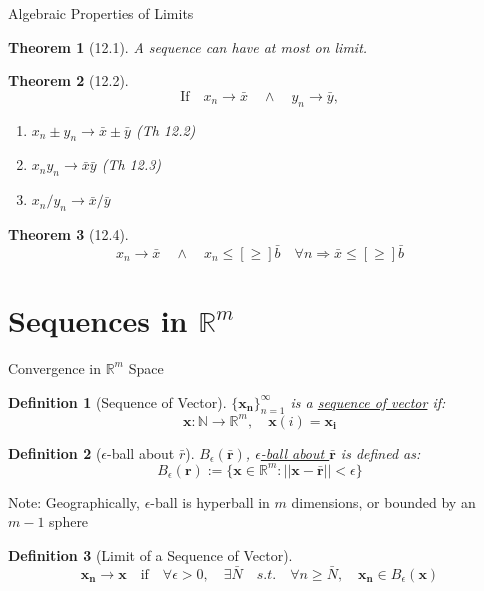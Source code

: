 \documentclass[a4paper,11pt]{article}
\newtheorem{defn}{Definition}
\newtheorem{thm}{Theorem}
\begin{document}
\begin{frame}[t]{Algebraic Properties of Limits}
	\begin{thm}
		[12.1] A sequence can have at most on limit.
	\end{thm}
	\begin{thm}
		[12.2]
		\[
			\text{If}\quad x_n \rightarrow \bar x \quad\land\quad y_n \rightarrow \bar y, 
		\]
		\begin{enumerate}
			\item $x_n\pm y_n \rightarrow \bar x \pm \bar y$ (Th 12.2)
			\item $x_n y_n \rightarrow \bar x \bar y$ (Th 12.3)
			\item $x_n / y_n \rightarrow \bar x / \bar y $
		\end{enumerate}
	\end{thm}
	\begin{thm}
		[12.4] \[
			x_n \rightarrow \bar x \quad\land\quad x_n \le[\ge] \bar b\quad\forall n \Rightarrow \bar x \le[\ge] \bar b 
		\]
	\end{thm}
\end{frame}

\section{Sequences in $\mathbb{R}^m$} %
\label{sec:sequences_in_mathbb_r_m}
\begin{frame}[t]{Convergence in $\mathbb{R}^m$ Space}
	\begin{defn}
		[Sequence of Vector]
		$\{\mathbf{x_n}\}_{n=1}^\infty$ is a \uline{sequence of vector} if:
		\[
			\mathbf{x}:\mathbb{N}\rightarrow \mathbb{R}^m,\quad \mathbf{x}(i) = \mathbf{x_i} 
		\]
	\end{defn}
	\begin{defn}
		[$\epsilon$-ball about $\bar r$]
		$B_\epsilon( \mathbf{\bar r})$, \uline{$\epsilon$-ball about $\mathbf{\bar  r}$} is defined as:
		\[
			B_\epsilon(\mathbf{r}):=\{\mathbf{x}\in\mathbb{R}^m: ||\mathbf{x-\bar r}||<\epsilon \}
		\]
	\end{defn}
	Note: Geographically, $\epsilon$-ball is hyperball in $m$ dimensions, or bounded by an $m-1$ sphere
	\begin{defn}
		[Limit of a Sequence of Vector]
		\[
			\mathbf{x_n}\rightarrow\mathbf{x} \quad\text{if}\quad \forall\epsilon>0,\quad\exists \bar N \quad s.t.\quad \forall n\ge\bar N,\quad \mathbf{x_n}\in B_\epsilon(\mathbf{x})
		\]
	\end{defn}
\end{frame}
\end{document}
